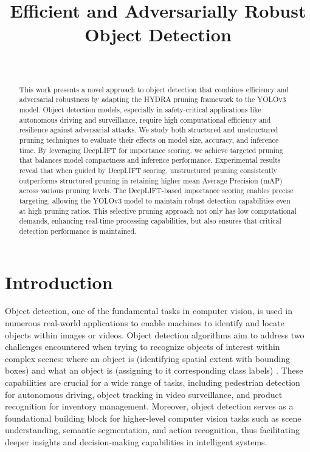 \documentclass[journal,onecolumn,12pt]{IEEEtran}
\begin{document}
\title{Efficient and Adversarially Robust Object Detection}
\author{
 \\
}

\maketitle

\begin{abstract}
\noindent This work presents a novel approach to object detection that combines efficiency and adversarial robustness by adapting the HYDRA pruning framework to the YOLOv3 model. Object detection models, especially in safety-critical applications like autonomous driving and surveillance, require high computational efficiency and resilience against adversarial attacks. We study both structured and unstructured pruning techniques to evaluate their effects on model size, accuracy, and inference time. By leveraging DeepLIFT for importance scoring, we achieve targeted pruning that balances model compactness and inference performance. Experimental results reveal that when guided by DeepLIFT scoring, unstructured pruning consistently outperforms structured pruning in retaining higher mean Average Precision (mAP) across various pruning levels. The DeepLIFT-based importance scoring enables precise targeting, allowing the YOLOv3 model to maintain robust detection capabilities even at high pruning ratios. This selective pruning approach not only has low computational demands, enhancing real-time processing capabilities, but also ensures that critical detection performance is maintained.
\end{abstract}


\section{Introduction}

Object detection, one of the fundamental tasks in computer vision, is used in numerous real-world applications to enable machines to identify and locate objects within images or videos. Object detection algorithms aim to address two challenges encountered when trying to recognize objects of interest within complex scenes: where an object is (identifying spatial extent with bounding boxes) and what an object is (assigning to it corresponding class labels) \cite{zhao2019objectdetectiondeeplearning}. These capabilities are crucial for a wide range of tasks, including pedestrian detection for autonomous driving, object tracking in video surveillance, and product recognition for inventory management. Moreover, object detection serves as a foundational building block for higher-level computer vision tasks such as scene understanding, semantic segmentation, and action recognition, thus facilitating deeper insights and decision-making capabilities in intelligent systems.
\end{document}

